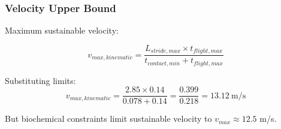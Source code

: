 \subsubsection{Velocity Upper Bound}

Maximum sustainable velocity:

\begin{equation}
v_{max,kinematic} = \frac{L_{stride,max} \times t_{flight,max}}{t_{contact,min} + t_{flight,max}}
\label{eq:kinematic_velocity_bound}
\end{equation}

Substituting limits:
\begin{equation}
v_{max,kinematic} = \frac{2.85 \times 0.14}{0.078 + 0.14} = \frac{0.399}{0.218} = 13.12~\text{m/s}
\label{eq:velocity_upper_bound}
\end{equation}

But biochemical constraints limit sustainable velocity to $v_{max} \approx 12.5$ m/s.

